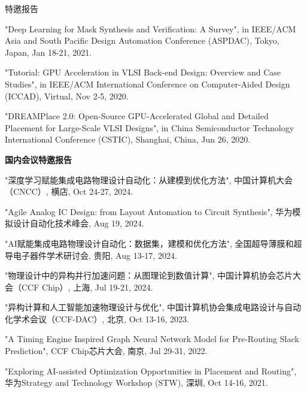 \begin{rSection}{特邀报告}
\begin{description}[font=\normalfont]
\item[{[T3]}]{
"Deep Learning for Mask Synthesis and Verification: A Survey", in IEEE/ACM Asia and South Pacific Design Automation Conference (ASPDAC), Tokyo, Japan, Jan 18-21, 2021.
}

\item[{[T2]}]{
"Tutorial: GPU Acceleration in VLSI Back-end Design: Overview and Case Studies", in IEEE/ACM International Conference on Computer-Aided Design (ICCAD), Virtual, Nov 2-5, 2020. 
}

\item[{[T1]}]{
"DREAMPlace 2.0: Open-Source GPU-Accelerated Global and Detailed Placement for Large-Scale VLSI Designs", in China Semiconductor Technology International Conference (CSTIC), Shanghai, China, Jun 26, 2020. 
}

\end{description}

\textbf{国内会议特邀报告}
        
\begin{description}[font=\normalfont]

\item[{[T12]}]{
"深度学习赋能集成电路物理设计自动化：从建模到优化方法", 中国计算机大会（CNCC）, 横店, Oct 24-27, 2024. 
}

\item[{[T11]}]{
    "Agile Analog IC Design: from Layout Automation to Circuit Synthesis", 华为模拟设计自动化技术峰会, Aug 19, 2024. 
}

\item[{[T10]}]{
"AI赋能集成电路物理设计自动化：数据集，建模和优化方法", 全国超导薄膜和超导电子器件学术研讨会, 贵阳, Aug 13-17, 2024. 
}

\item[{[T9]}]{
"物理设计中的异构并行加速问题：从图理论到数值计算", 中国计算机协会芯片大会（CCF Chip）, 上海, Jul 19-21, 2024. 
}

\item[{[T8]}]{
"异构计算和人工智能加速物理设计与优化", 中国计算机协会集成电路设计与自动化学术会议（CCF-DAC）, 北京, Oct 13-16, 2023. 
}

\item[{[T7]}]{
"A Timing Engine Inspired Graph Neural Network Model for Pre-Routing Slack Prediction", CCF Chip芯片大会, 南京, Jul 29-31, 2022. 
}

\item[{[T6]}]{
"Exploring AI-assisted Optimization Opportunities in Placement and Routing", 华为Strategy and Technology Workshop (STW), 深圳, Oct 14-16, 2021. 
}


\end{description}
\end{rSection}
